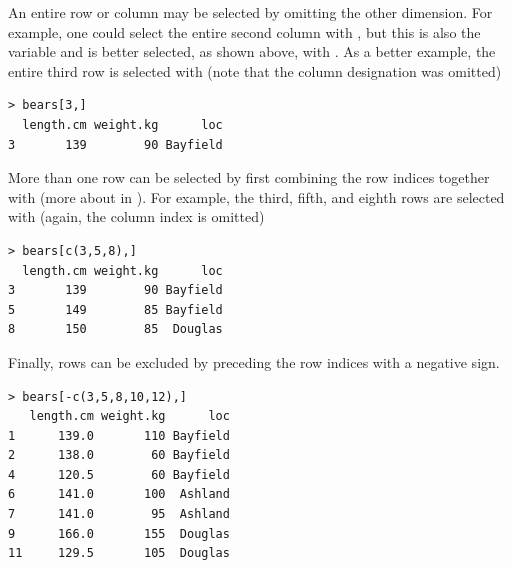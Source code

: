 \documentclass[10pt,openany]{book}\usepackage[]{graphicx}\usepackage[]{color}
\makeatletter
\newenvironment{kframe}{%
 \def\at@end@of@kframe{}%
 \ifinner\ifhmode%
  \def\at@end@of@kframe{\end{minipage}}%
  \begin{minipage}{\columnwidth}%
 \fi\fi%
 \def\FrameCommand##1{\hskip\@totalleftmargin \hskip-\fboxsep
 \colorbox{shadecolor}{##1}\hskip-\fboxsep
     \hskip-\linewidth \hskip-\@totalleftmargin \hskip\columnwidth}%
 \MakeFramed {\advance\hsize-\width
   \@totalleftmargin\z@ \linewidth\hsize
   \@setminipage}}%
 {\par\unskip\endMakeFramed%
 \at@end@of@kframe}
\newenvironment{knitrout}{}{} %
\makeatother
\begin{document}
An entire row or column may be selected by omitting the other dimension.  For example, one could select the entire second column with , but this is also the  variable and is better selected, as shown above, with .  As a better example, the entire third row is selected with (note that the column designation was omitted)
\begin{knitrout}
\color{fgcolor}\begin{kframe}
\begin{verbatim}
> bears[3,]
  length.cm weight.kg      loc
3       139        90 Bayfield
\end{verbatim}
\end{kframe}
\end{knitrout}

More than one row can be selected by first combining the row indices together with  (more about  in ).  For example, the third, fifth, and eighth rows are selected with (again, the column index is omitted)
\begin{knitrout}
\color{fgcolor}\begin{kframe}
\begin{verbatim}
> bears[c(3,5,8),]
  length.cm weight.kg      loc
3       139        90 Bayfield
5       149        85 Bayfield
8       150        85  Douglas
\end{verbatim}
\end{kframe}
\end{knitrout}

Finally, rows can be excluded by preceding the row indices with a negative sign.
\begin{knitrout}
\color{fgcolor}\begin{kframe}
\begin{verbatim}
> bears[-c(3,5,8,10,12),]
   length.cm weight.kg      loc
1      139.0       110 Bayfield
2      138.0        60 Bayfield
4      120.5        60 Bayfield
6      141.0       100  Ashland
7      141.0        95  Ashland
9      166.0       155  Douglas
11     129.5       105  Douglas
\end{verbatim}
\end{kframe}
\end{knitrout}

\vspace{-12pt}
\end{document}
